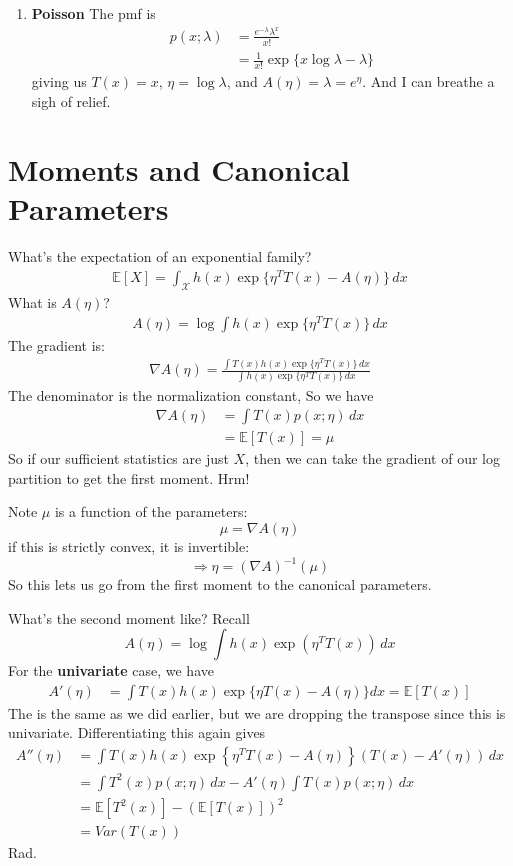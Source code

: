 \documentclass{article}
\newcommand{\E}{\mathbb{E}}
\newcommand{\inv}{^{-1}}
\begin{document}
\begin{enumerate}
	\item
	\textbf{Poisson}
	The pmf is
	\begin{align}
	p(x;\lambda)
	&=
	\frac{e^{-\lambda} \lambda^x}{ x!}
	\\
	&=
	\frac{1}{x!} \exp\{
	x\log \lambda - \lambda
	\}
	\end{align}
	giving us
	$T(x) = x$, $\eta = \log \lambda$, and $A(\eta) = \lambda = e^\eta$.
	And I can breathe a sigh of relief.
	
	
	
\end{enumerate}




\section{Moments and Canonical Parameters}

What's the expectation of an exponential family?
\begin{align*}
\E[X] = 
\int_{\mathcal X}
h(x) \exp\{
\eta^TT(x) - A(\eta)
\}
\, dx
\end{align*}
What is $A(\eta)$?
\begin{align*}
A(\eta) =
\log
\int
h(x) \exp\{
	\eta^T T(x)
\}
\, dx
\end{align*}
The gradient is:
\begin{align*}
\nabla
A(\eta) =
\frac
{
\int T(x) h(x) \exp\{\eta^T T(x)\} \, dx
}
{
\int
h(x) \exp\{
	\eta^T T(x)
\}
\, dx
}
\end{align*}
The denominator is the normalization constant, So we have
\begin{align*}
\nabla
A(\eta) &=
\int
T(x) p(x;\eta)
\, dx
\\
&=
\E[T(x)]
= \mu
\end{align*}
So if our sufficient statistics are just $X$, then we can take the gradient of our log partition to get the first moment.
Hrm!

Note $\mu$ is a function of the parameters:
$$
\mu = \nabla A(\eta)
$$
if this is strictly convex, it is invertible:
$$
\Rightarrow
\eta = (\nabla A)\inv (\mu)
$$
So this lets us go from the first moment to the canonical parameters.

What's the second moment like? 
Recall
$$
A(\eta)
=
\log
\int
h(x) \exp(\eta^T T(x))
\,
dx
$$
For the \textbf{univariate} case, we have
\begin{align*}
A'(\eta)
&=
\int T(x) h(x) \exp\{ \eta T(x) - A(\eta)\} dx = \E[T(x)]
\end{align*}
The is the same as we did earlier, but we are dropping the transpose since this is univariate. Differentiating this again gives
\begin{align*}
A''(\eta)
&=
\int
T(x)
h(x)
\exp
\left\{
\eta^T T(x) - A(\eta)
\right\}
(T(x) - A'(\eta))
\,
dx
\\
&=
\int
T^2(x)
p(x;\eta)
\,
dx
-
A'(\eta)
\int
T(x) p(x;\eta)\, dx
\\
&=
\E[
T^2(x)
]
- (\E[T(x)])^2
\\
&=
Var(T(x))
\end{align*}
Rad. 
\end{document}
